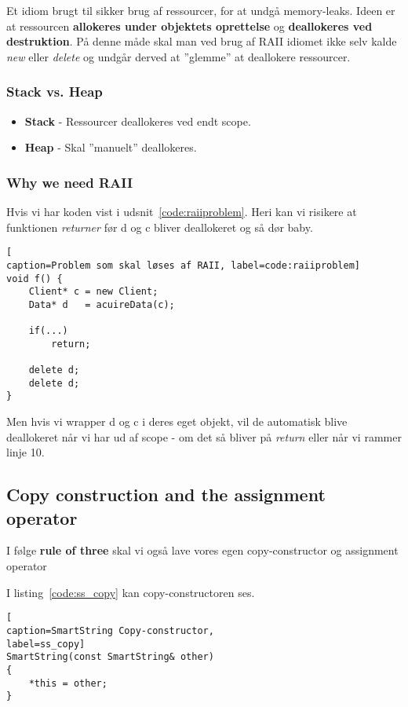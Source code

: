 Et idiom brugt til sikker brug af ressourcer, for at undgå memory-leaks. Ideen er at ressourcen \textbf{allokeres under objektets oprettelse} og \textbf{deallokeres ved destruktion}. På denne måde skal man ved brug af RAII idiomet ikke selv kalde \textit{new} eller \textit{delete} og undgår derved at ''glemme'' at deallokere ressourcer.

\subsubsection{Stack vs. Heap}
\begin{itemize}
	\item \textbf{Stack} - Ressourcer deallokeres ved endt scope.
	\item \textbf{Heap} - Skal ''manuelt'' deallokeres.
\end{itemize}

\subsubsection{Why we need RAII}
Hvis vi har koden vist i udsnit~\ref{code:raiiproblem}. Heri kan vi risikere at funktionen \textit{returner} før d og c bliver deallokeret og så dør baby.

\begin{minipage}{\linewidth}
\begin{lstlisting}[
caption=Problem som skal løses af RAII, label=code:raiiproblem]
void f() {
	Client* c = new Client;
	Data* d   = acuireData(c);
	
	if(...)
		return;
	
	delete d;
	delete d; 
}
\end{lstlisting}
\end{minipage}

Men hvis vi wrapper d og c i deres eget objekt, vil de automatisk blive deallokeret når vi har ud af scope - om det så bliver på \textit{return} eller når vi rammer linje 10.

\subsection{Copy construction and the assignment operator}
I følge \textbf{rule of three} skal vi også lave vores egen copy-constructor og assignment operator

I listing~\ref{code:ss_copy} kan copy-constructoren ses. 

\begin{lstlisting}[
caption=SmartString Copy-constructor, 
label=ss_copy]
SmartString(const SmartString& other)
{
	*this = other;
}
\end{lstlisting}

